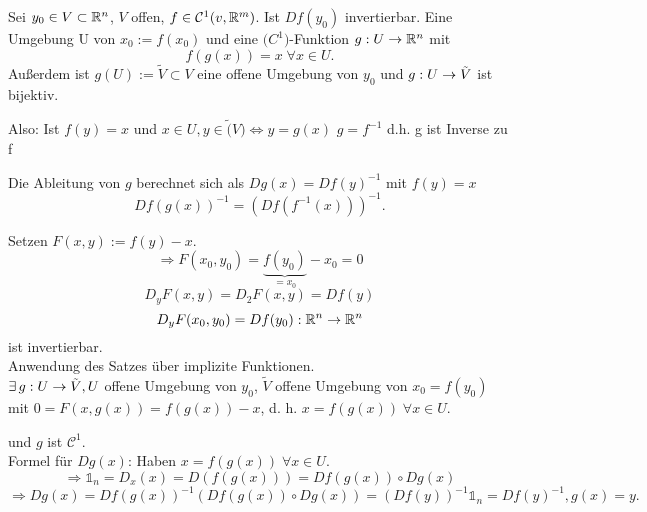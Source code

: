 \documentclass[../ana2.tex]{subfiles}
\begin{document}
\begin{satz}
    Sei \( y_0 \in V \subset \mathbb{R}^n \), \( V \) offen, 
    \( f \in \mathcal{C}^1(v, \mathbb{R}^m) \). Ist \( Df (y_0) \) 
    invertierbar.
    Eine Umgebung U von \(x_0 := f(x_0) \) und eine \(\mathcal(C^1)\)-Funktion 
    \(g:U\rightarrow \mathbb{R}^n\) mit
    \[ f(g(x)) = x \;\forall x \in U. \]
    Außerdem ist \( g(U) := \tilde{V} \subset V \) eine offene Umgebung
    von \( y_0 \) und 
    \( g:U\rightarrow \tilde{V} \) ist bijektiv.
    \begin{bem}
        Also: Ist \(f(y) = x\) und \(x \in U, y \in \tilde(V) \Leftrightarrow y = g(x)\)
        \(g = f^{-1}\) d.h. g ist Inverse zu f
    \end{bem}
    Die Ableitung von \(g\) berechnet sich als 
    \( Dg(x) = Df(y)^{-1} \) mit \( f(y) = x \)
    \[ Df(g(x))^{-1} = (Df(f^{-1}(x)))^{-1}. \]
\end{satz}
\begin{bew}
    Setzen \( F(x,y) := f(y) - x \).
    \[ \Rightarrow F(x_0, y_0) = \underbrace{f(y_0)}_{=x_0} - x_0 = 0 \]
    \[ D_y F(x,y) = D_2 F(x,y) = Df(y) \]
    \[ D_y F(x_0, y_0) 
    = Df(y_0):\mathbb{R}^n\rightarrow \mathbb{R}^n \]
    ist invertierbar.\\
    Anwendung des Satzes über implizite Funktionen.\\
    \( \exists \abb{g}{U}{\tilde{V}}, U \) offene Umgebung 
    von \(y_0\), \(\tilde{V}\) offene Umgebung von \( x_0 = f(y_0) \)
    mit \(0= F(x, g(x)) = f(g(x))-x\), d. h. \( x = f(g(x)) \;\forall x \in U \).

    und \(g\) ist \(\mathcal{C}^1\).\\
    Formel für \(Dg(x)\): Haben \(x = f(g(x)) \;\forall x\in U\).
    \[ \Rightarrow \mathds{1}_n = D_x(x) = D(f(g(x))) 
    = Df(g(x)) \circ D g(x) \]
    \[ \Rightarrow D g(x) = D f(g(x))^{-1}(Df(g(x)) \circ Dg(x))
    = (Df(y))^{-1} \mathds{1}_n = Df(y)^{-1}, g(x) = y. \]
\end{bew}
\end{document}
